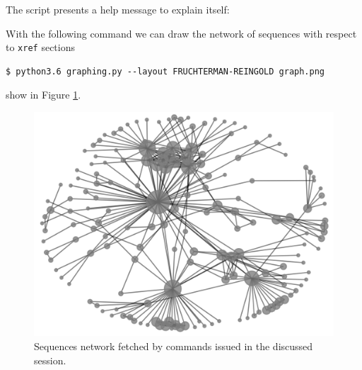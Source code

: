 The script presents a help message to explain itself:

With the following command we can draw the network of sequences
with respect to \verb|xref| sections
\begin{Verbatim}[fontsize=\small]
$ python3.6 graphing.py --layout FRUCHTERMAN-REINGOLD graph.png
\end{Verbatim}
show in Figure \ref{fig:oeis:sequences:network}.

\begin{figure}
\includegraphics{OEIS/graph1}
\caption{Sequences network fetched by commands issued in the discussed session.}
\label{fig:oeis:sequences:network}
\end{figure}


